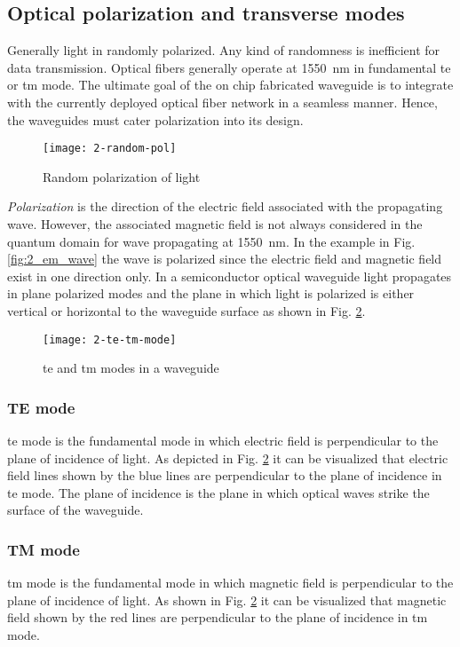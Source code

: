 \documentclass[../report.tex]{subfiles}
\begin{document}
		\subsection{Optical polarization and transverse modes}
Generally light in randomly polarized. Any kind of randomness is inefficient for data transmission. Optical fibers generally operate at \SI{1550}{\nano\metre} in fundamental \gls{te} or \gls{tm} mode. The ultimate goal of the on chip fabricated waveguide is to integrate with the currently deployed optical fiber network in a seamless manner. Hence, the waveguides must cater polarization into its design.  
\begin{figure}[h]
	\centering
	\texttt{[image: 2-random-pol]}
	\caption{Random polarization of light}
	\label{fig:2_random_pol}
\end{figure}
\textit{Polarization} is the direction of the electric field associated with the propagating wave. However, the associated magnetic field is not always considered in the quantum domain for wave propagating at \SI{1550}{\nano\metre}. In the example in Fig. \ref{fig:2_em_wave} the wave is polarized since the electric field and magnetic field exist in one direction only. In a semiconductor optical waveguide light propagates in plane polarized modes and the plane in which light is polarized is either vertical or horizontal to the waveguide surface as shown in Fig. \ref{fig:2_te_tm_mode}. 
\begin{figure}[H]
	\centering
	\texttt{[image: 2-te-tm-mode]}
	\caption{\gls{te} and \gls{tm} modes in a waveguide}
	\label{fig:2_te_tm_mode}
\end{figure}			
			\subsubsection{TE mode}
\gls{te} mode is the fundamental mode in which electric field is perpendicular to the plane of incidence of light. As depicted in Fig. \ref{fig:2_te_tm_mode} it can be visualized that electric field lines shown by the blue lines are perpendicular to the plane of incidence in \gls{te} mode. The plane of incidence is the plane in which optical waves strike the surface of the waveguide.						
			\subsubsection{TM mode}
\gls{tm} mode is the fundamental mode in which magnetic field is perpendicular to the plane of incidence of light. As shown in Fig. \ref{fig:2_te_tm_mode} it can be visualized that magnetic field shown by the red lines are perpendicular to the plane of incidence in \gls{tm} mode.			
		
\end{document}
